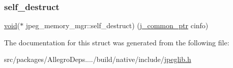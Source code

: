 \subsubsection{\texorpdfstring{self\+\_\+destruct}{self\_destruct}}
{\footnotesize\ttfamily \hyperlink{png_8h_ac9c84fa68bbad002983e35ce3663c686}{void}($\ast$ jpeg\+\_\+memory\+\_\+mgr\+::self\+\_\+destruct) (\hyperlink{jpeglib_8h_a1a177ab705cefea8f30ec31a48e62650}{j\+\_\+common\+\_\+ptr} cinfo)}



The documentation for this struct was generated from the following file\+:\begin{DoxyCompactItemize}
\item 
src/packages/\+Allegro\+Deps..../build/native/include/\hyperlink{jpeglib_8h}{jpeglib.\+h}\end{DoxyCompactItemize}
